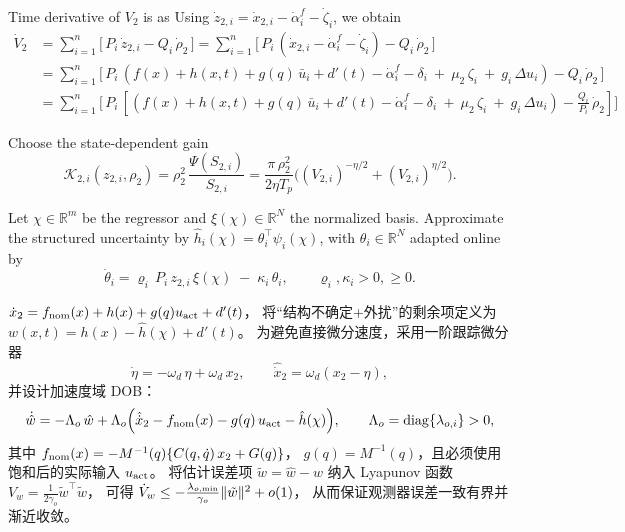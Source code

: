 \documentclass[pdflatex,sn-mathphys-num]{sn-jnl}%
\theoremstyle{thmstyleone}%
\theoremstyle{thmstyletwo}%
\theoremstyle{thmstylethree}%
\begin{document}
Time derivative of $V_2$ is as
Using $\dot z_{2,i}=\dot x_{2,i}-\dot\alpha_i^{f}-\dot\zeta_i$, we obtain
\begin{equation}
	\begin{aligned}
		\dot V_2&=\sum_{i=1}^n \Big[\,P_i\,\dot z_{2,i}-Q_{i}\,\dot\rho_{2}\,\Big] = \sum_{i=1}^n \Big[\,P_i\,(\dot x_{2,i}-\dot\alpha_i^{f}-\dot\zeta_i)-Q_{i}\,\dot\rho_{2}\,\Big]\\
		&
		 = \sum_{i=1}^n \Big[\,P_i\,(f(x)+h(x,t)+g(q)\,\bar{u}_i+d'(t)-\dot\alpha_i^{f}-\delta_i\ +\ \mu_2\,\zeta_i\ +\ g_i\,\Delta u_i)-Q_{i}\,\dot\rho_{2}\,\Big]\\
		&
		 = \sum_{i=1}^n \Big[\,P_i\,[(f(x)+h(x,t)+g(q)\,\bar{u}_i+d'(t)-\dot\alpha_i^{f}-\delta_i\ +\ \mu_2\,\zeta_i\ +\ g_i\,\Delta u_i)-\frac{Q_{i}}{P_i}\,\dot\rho_{2}]\Big]
	\end{aligned}
\end{equation}

 Choose the state-dependent gain
\begin{equation}\label{eq:k2-pts}
\mathcal{K}_{2,i}(z_{2,i},\rho_{2})=\rho_{2}^{2}\,\frac{\Psi(S_{2,i})}{S_{2,i}}
=\frac{\pi\,\rho_{2}^2}{2\eta T_p}\Big((V_{2,i})^{-\eta/2}+(V_{2,i})^{\eta/2}\Big).
\end{equation}

Let $\chi\in\mathbb{R}^m$ be the regressor and $\xi(\chi)\in\mathbb{R}^{N}$ the normalized basis. Approximate the structured uncertainty by
\( \hat h_i(\chi)=\theta_i^\top \psi_i(\chi)\),
with $\theta_i\in\mathbb{R}^{N}  $ adapted online by
\begin{equation}\label{eq:theta-law}
\dot\theta_i = \varrho_i\,P_i\,z_{2,i}\,\xi(\chi) \;-\; \kappa_i\,\theta_i,\qquad
\varrho_i,\kappa_i>0, \ge 0.
\end{equation}


$\dot x_2 = f_{\rm nom}(x)+h(x)+g(q)u_{\rm act}+d'(t)$，
将“结构不确定+外扰”的剩余项定义为
$w(x,t)=h(x)-\hat h(\chi)+d'(t)$。
为避免直接微分速度，采用一阶跟踪微分器
\[
\dot\eta=-\omega_d\,\eta+\omega_d\,x_2,\qquad 
\hat{\dot x}_2=\omega_d(x_2-\eta),
\]
并设计加速度域 DOB：
\begin{equation}\label{eq:dob-correct}
\dot{\hat w}= -\Lambda_o\,\hat w
+\Lambda_o\Big(\hat{\dot x}_2 - f_{\rm nom}(x) - g(q)\,u_{\rm act} - \hat h(\chi)\Big),
\qquad \Lambda_o=\mathrm{diag}\{\lambda_{o,i}\}>0,
\end{equation}
其中 $f_{\rm nom}(x)=-M^{-1}(q)\{C(q,\dot q)\,x_2+G(q)\}$，
$g(q)=M^{-1}(q)$，且必须使用饱和后的实际输入 $u_{\rm act}$。
将估计误差项 $\tilde w=\hat w-w$ 纳入 Lyapunov 函数
$V_w=\tfrac{1}{2\gamma_o}\tilde w^\top\tilde w$，
可得 $\dot V_w\le -\tfrac{\lambda_{o,\min}}{\gamma_o}\|\tilde w\|^2+{\small o}(1)$，
从而保证观测器误差一致有界并渐近收敛。
\end{document}
